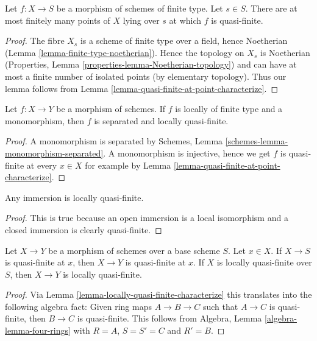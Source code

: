 \begin{lemma}
\label{lemma-quasi-finite-at-a-finite-number-of-points}
Let $f : X \to S$ be a morphism of schemes of finite type.
Let $s \in S$. There are at most finitely many points
of $X$ lying over $s$ at which $f$ is quasi-finite.
\end{lemma}

\begin{proof}
The fibre $X_s$ is a scheme of finite type over a field,
hence Noetherian (Lemma \ref{lemma-finite-type-noetherian}).
Hence the topology on $X_s$ is Noetherian (Properties, Lemma
\ref{properties-lemma-Noetherian-topology})
and can have at most a finite number of isolated points (by elementary
topology). Thus our lemma follows from
Lemma \ref{lemma-quasi-finite-at-point-characterize}.
\end{proof}

\begin{lemma}
\label{lemma-monomorphism-loc-finite-type-loc-quasi-finite}
Let $f : X \to Y$ be a morphism of schemes.
If $f$ is locally of finite type and a monomorphism, then $f$
is separated and locally quasi-finite.
\end{lemma}

\begin{proof}
A monomorphism is separated by Schemes, Lemma
\ref{schemes-lemma-monomorphism-separated}.
A monomorphism is injective, hence we get $f$
is quasi-finite at every $x \in X$ for example by
Lemma \ref{lemma-quasi-finite-at-point-characterize}.
\end{proof}

\begin{lemma}
\label{lemma-immersion-locally-quasi-finite}
Any immersion is locally quasi-finite.
\end{lemma}

\begin{proof}
This is true because an open immersion is a local isomorphism
and a closed immersion is clearly quasi-finite.
\end{proof}

\begin{lemma}
\label{lemma-permanence-quasi-finite}
Let $X \to Y$ be a morphism of schemes over a base scheme $S$.
Let $x \in X$. If $X \to S$ is quasi-finite at $x$, then
$X \to Y$ is quasi-finite at $x$.
If $X$ is locally quasi-finite over $S$, then $X \to Y$
is locally quasi-finite.
\end{lemma}

\begin{proof}
Via Lemma \ref{lemma-locally-quasi-finite-characterize} this translates
into the following algebra
fact: Given ring maps $A \to B \to C$ such that $A \to C$ is
quasi-finite, then $B \to C$ is quasi-finite.
This follows from
Algebra, Lemma \ref{algebra-lemma-four-rings}
with $R = A$, $S = S' = C$ and $R' = B$.
\end{proof}















